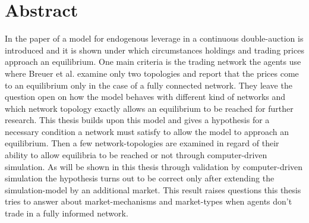 \documentclass[Bachelorarbeit.tex]{subfiles}
\begin{document}
\chapter*{Abstract}
In the paper of \cite{Breuer2015} a model for endogenous leverage in a continuous double-auction is introduced and it is shown under which circumstances holdings and trading prices approach an equilibrium. One main criteria is the trading network the agents use where Breuer et al. examine only two topologies and report that the prices come to an equilibrium only in the case of a fully connected network. They leave the question open on how the model behaves with different kind of networks and which network topology exactly allows an equilibrium to be reached  for further research. This thesis builds upon this model and gives a hypothesis for a necessary condition a network must satisfy to allow the model to approach an equilibrium. Then a few network-topologies are examined in regard of their ability to allow equilibria to be reached or not through computer-driven simulation. As will be shown in this thesis through validation by computer-driven simulation the hypothesis turns out to be correct only after extending the simulation-model by an additional market. This result raises questions this thesis tries to answer about market-mechanisms and market-types when agents don't trade in a fully informed network. 
\end{document}
